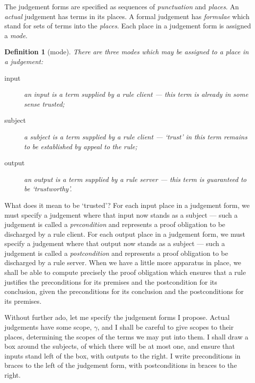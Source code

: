 \documentclass{jfp1}
\newtheorem{definition}[theorem]{Definition}
\begin{document}
The judgement forms are specified as sequences of \emph{punctuation}
and \emph{places}. An \emph{actual} judgement has terms in its places.
A formal judgement has \emph{formulae} which stand for sets of terms into the
\emph{places}. Each place in a judgement form is assigned a \emph{mode}.

\begin{definition}[mode]
  There are three modes which may be assigned to a place in a judgement:
  \begin{description}
  \item[input] an input is a term supplied by a rule client ---
    this term is already in some sense trusted;
  \item[subject] a subject is a term supplied by a rule client ---
    `trust' in this term remains to be established by appeal to the rule;
  \item[output] an output is a term supplied by a rule server ---
    this term is guaranteed to be `trustworthy'.
  \end{description}
\end{definition}

What does it mean to be `trusted'? For each input place in a judgement
form, we must specify a judgement where that input now stands as a
subject --- such a judgement is called a \emph{precondition} and
represents a proof obligation to be discharged by a rule client. For
each output place in a judgement form, we must specify a judgement
where that output now stands as a subject --- such a judgement is
called a \emph{postcondition} and represents a proof obligation to be
discharged by a rule server. When we have a little more apparatus in
place, we shall be able to compute precisely the proof obligation which ensures
that a rule justifies the preconditions for its premises and the postcondition
for its conclusion, given the preconditions for its conclusion and the postconditions
for its premises.

Without further ado, let me specify the judgement forms I
propose. Actual judgements have some scope, $\gamma$, and I shall be
careful to give scopes to their places, determining the scopes of the
terms we may put into them. I shall draw a box around the
subjects, of which there will be at most one, and ensure that inputs
stand left of the box, with outputs to the right.  I write
preconditions in braces to the left of the judgement form, with
postconditions in braces to the right.
\end{document}
